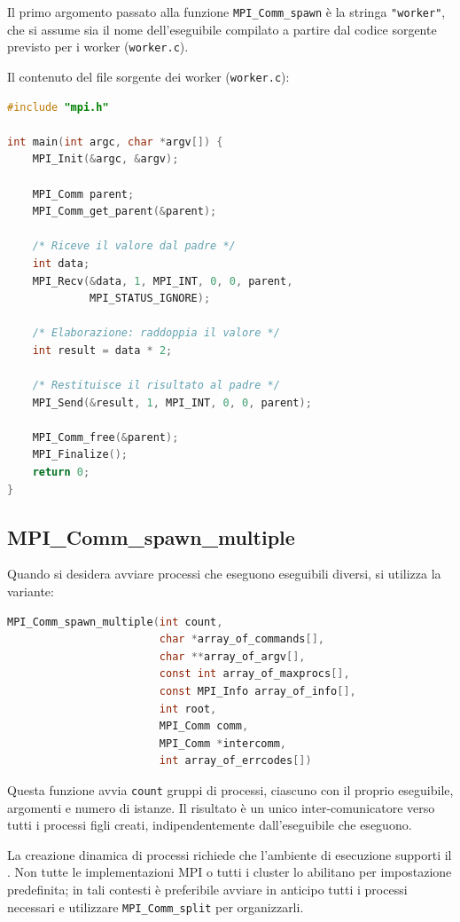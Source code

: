 \begin{note}{}
    Il primo argomento passato alla funzione \texttt{MPI\_Comm\_spawn} è la stringa \texttt{"worker"}, che si assume sia il nome dell'eseguibile compilato a partire dal codice sorgente previsto per i worker (\texttt{worker.c}).
\end{note}

Il contenuto del file sorgente dei worker (\texttt{worker.c}):
\begin{lstlisting}[language=C, numbers=none]
#include "mpi.h"

int main(int argc, char *argv[]) {
    MPI_Init(&argc, &argv);

    MPI_Comm parent;
    MPI_Comm_get_parent(&parent);

    /* Riceve il valore dal padre */
    int data;
    MPI_Recv(&data, 1, MPI_INT, 0, 0, parent,
             MPI_STATUS_IGNORE);

    /* Elaborazione: raddoppia il valore */
    int result = data * 2;

    /* Restituisce il risultato al padre */
    MPI_Send(&result, 1, MPI_INT, 0, 0, parent);

    MPI_Comm_free(&parent);
    MPI_Finalize();
    return 0;
}
\end{lstlisting}

\subsection{MPI\_Comm\_spawn\_multiple}
Quando si desidera avviare processi che eseguono eseguibili diversi, si utilizza la variante:
\begin{lstlisting}[language=C, numbers=none]
MPI_Comm_spawn_multiple(int count,
                        char *array_of_commands[],
                        char **array_of_argv[],
                        const int array_of_maxprocs[],
                        const MPI_Info array_of_info[],
                        int root,
                        MPI_Comm comm,
                        MPI_Comm *intercomm,
                        int array_of_errcodes[])
\end{lstlisting}
Questa funzione avvia \texttt{count} gruppi di processi, ciascuno con il proprio eseguibile, argomenti e numero di istanze. Il risultato è un unico inter-comunicatore verso tutti i processi figli creati, indipendentemente dall'eseguibile che eseguono.

\begin{note}{}
    La creazione dinamica di processi richiede che l'ambiente di esecuzione supporti il . Non tutte le implementazioni MPI o tutti i cluster lo abilitano per impostazione predefinita; in tali contesti è preferibile avviare in anticipo tutti i processi necessari e utilizzare \texttt{MPI\_Comm\_split} per organizzarli.
\end{note}

